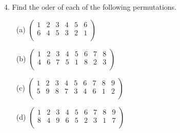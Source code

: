 \newpage
\begin{mdframed}[style=darkQuesion]
  4. Find the oder of each of the following permutations.
  \begin{itemize}
    \item [(a)] {
          $\begin{pmatrix}
              1 & 2 & 3 & 4 & 5 & 6 \\
              6 & 4 & 5 & 3 & 2 & 1 \\
            \end{pmatrix}$
          }
    \item [(b)] {
          $\begin{pmatrix}
              1 & 2 & 3 & 4 & 5 & 6 & 7 & 8 \\
              4 & 6 & 7 & 5 & 1 & 8 & 2 & 3 \\
            \end{pmatrix}$
          }
    \item [(c)] {
          $\begin{pmatrix}
              1 & 2 & 3 & 4 & 5 & 6 & 7 & 8 & 9 \\
              5 & 9 & 8 & 7 & 3 & 4 & 6 & 1 & 2 \\
            \end{pmatrix}$
          }
    \item [(d)] {
          $\begin{pmatrix}
              1 & 2 & 3 & 4 & 5 & 6 & 7 & 8 & 9 \\
              8 & 4 & 9 & 6 & 5 & 2 & 3 & 1 & 7 \\
            \end{pmatrix}$
          }
  \end{itemize}
\end{mdframed}

